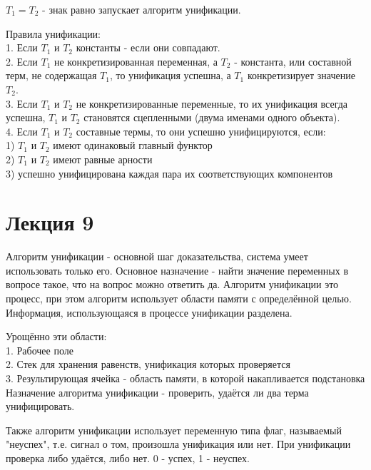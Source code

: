 $T_1 = T_2$ - знак равно запускает алгоритм унификации.

Правила унификации:\\
1. Если $T_1$ и $T_2$ константы - если они совпадают.\\
2. Если $T_1$ не конкретизированная переменная, а $T_2$ - константа, или составной терм, не содержащая $T_1$, то унификация успешна, а $T_1$ конкретизирует значение $T_2$.\\
3. Если $T_1$ и $T_2$ не конкретизированные переменные, то их унификация всегда успешна, $T_1$ и $T_2$ становятся сцепленными (двума именами одного объекта).\\
4. Если $T_1$ и $T_2$ составные термы, то они успешно унифицируются, если:\\
1) $T_1$ и $T_2$ имеют одинаковый главный функтор\\
2) $T_1$ и $T_2$ имеют равные арности\\
3) успешно унифицирована каждая пара их соответствующих компонентов\\

\chapter{Лекция 9}
Алгоритм унификации - основной шаг доказательства, система умеет использовать только его. Основное назначение - найти значение переменных в вопросе такое, что на вопрос можно ответить да. Алгоритм унификации это процесс, при этом алгоритм использует области памяти с определённой целью. Информация, использующаяся в процессе унификации разделена. 

Урощённо эти области:\\
1. Рабочее поле\\
2. Стек для хранения равенств, унификация которых проверяется\\
3. Результирующая ячейка - область памяти, в которой накапливается подстановка\\

Назначение алгоритма унификации - проверить, удаётся ли два терма унифицировать. 

Также алгоритм унификации использует переменную типа флаг, называемый "неуспех", т.е. сигнал о том, произошла унификация или нет. При унификации проверка либо удаётся, либо нет. 0 - успех, 1 - неуспех. 

